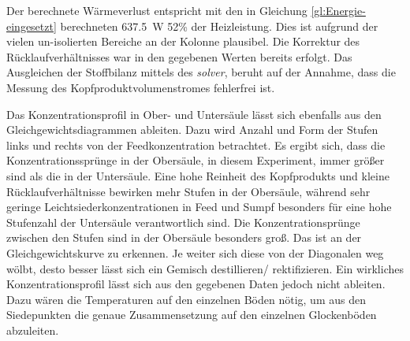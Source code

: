 Der berechnete Wärmeverlust entspricht mit den in Gleichung \eqref{gl:Energie-eingesetzt} berechneten \SI{637,5}{\watt} 52\% der Heizleistung. Dies ist aufgrund der vielen un-isolierten Bereiche an der Kolonne plausibel. Die Korrektur des Rücklaufverhältnisses war in den gegebenen Werten bereits erfolgt. Das Ausgleichen der Stoffbilanz mittels des \emph{solver}, beruht auf der Annahme, dass die Messung des Kopfproduktvolumenstromes fehlerfrei ist.
\vspace*{-2.5mm}
\begin{table}[h!]
	\centering
	\caption{Vergleich der Ergebnisse aus händischer Berechnung zu den Ergebnissen des Programms VLE}
	\label{tab:Vergleich}
\end{table}
\FloatBarrier
\vspace*{-2.5mm}
Das Konzentrationsprofil in Ober- und Untersäule lässt sich ebenfalls aus den Gleichgewichtsdiagrammen ableiten. Dazu wird Anzahl und Form der Stufen links und rechts von der Feedkonzentration betrachtet. Es ergibt sich, dass die Konzentrationssprünge in der Obersäule, in diesem Experiment, immer größer sind als die in der Untersäule. Eine hohe Reinheit des Kopfprodukts und kleine Rücklaufverhältnisse bewirken mehr Stufen in der Obersäule, während sehr geringe Leichtsiederkonzentrationen in Feed und Sumpf besonders für eine hohe Stufenzahl der Untersäule verantwortlich sind. Die Konzentrationsprünge zwischen den Stufen sind in der Obersäule besonders groß. Das ist an der Gleichgewichtskurve zu erkennen. Je weiter sich diese von der Diagonalen weg wölbt, desto besser lässt sich ein Gemisch destillieren/ rektifizieren. Ein wirkliches Konzentrationsprofil lässt sich aus den gegebenen Daten jedoch nicht ableiten. Dazu wären die Temperaturen auf den einzelnen Böden nötig, um aus den Siedepunkten die genaue Zusammensetzung auf den einzelnen Glockenböden abzuleiten.


